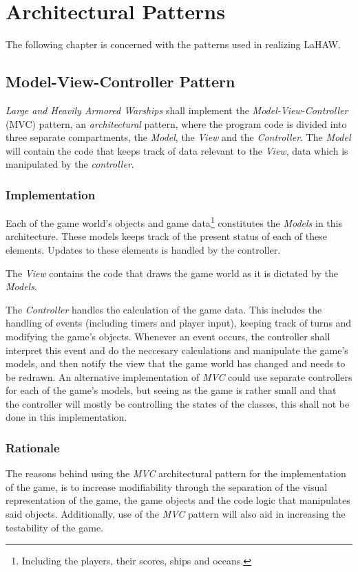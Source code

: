 \chapter{Architectural Patterns}
The following chapter is concerned with the patterns used in realizing LaHAW.


    \section{Model-View-Controller Pattern}
    \emph{Large and Heavily Armored Warships} shall implement the \emph{Model-View-Controller} (MVC) pattern, an \emph{architectural} pattern, where the program code is divided into three separate compartments, the \emph{Model}, the \emph{View} and the \emph{Controller}. The \emph{Model} will contain the code that keeps track of data relevant to the \emph{View}, data which is manipulated by the \emph{controller}.
    
        \subsection{Implementation}
        Each of the game world's objects and game data\footnote{Including the players, their scores, ships and oceans.} constitutes the \emph{Models} in this architecture. These models keeps track of the present status of each of these elements. Updates to these elements is handled by the controller.
    
        The \emph{View} contains the code that draws the game world as it is dictated by the \emph{Models}.
    
        The \emph{Controller} handles the calculation of the game data. This includes the handling of events (including timers and player input), keeping track of turns and modifying the game's objects.
        Whenever an event occurs, the controller shall interpret this event and do the neccesary calculations and manipulate the game's models, and then notify the view that the game world has changed and needs to be redrawn.
        An alternative implementation of \emph{MVC} could use separate controllers for each of the game's models, but seeing as the game is rather small and that the controller will mostly be controlling the states of the classes, this shall not be done in this implementation.
    
        \subsection{Rationale}
        The reasons behind using the \emph{MVC} architectural pattern for the implementation of the game, is to increase modifiability through the separation of the visual representation of the game, the game objects and the code logic that manipulates said objects. Additionally, use of the \emph{MVC} pattern will also aid in increasing the testability of the game.

